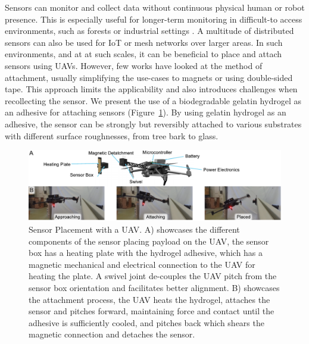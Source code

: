 Sensors can monitor and collect data without continuous physical human or robot presence. This is especially useful for longer-term monitoring in difficult-to access environments, such as forests or industrial settings \cite{Geckeler2022a, Hamaza, Jarvis2018}. A multitude of distributed sensors can also be used for IoT or mesh networks over larger areas. In such environments, and at at such scales, it can be beneficial to place and attach sensors using UAVs. 
However, few works have looked at the method of attachment, usually simplifying the use-cases to magnets or using double-sided tape. This approach limits the applicability and also introduces challenges when recollecting the sensor. We present the use of a biodegradable gelatin hydrogel as an adhesive for attaching sensors (Figure~\ref{fig:fig4-placeholder}). By using gelatin hydrogel as an adhesive, the sensor can be strongly but reversibly attached to various substrates with different surface roughnesses, from tree bark to glass.

\begin{figure}
  \includegraphics[width=\linewidth]{chapters/papers/SB/figures/fig-4-sensor-placement-placeholder/fig-4-sensor-placement-placeholder.pdf}
  \caption{Sensor Placement with a UAV. A) showcases the different components of the sensor placing payload on the UAV, the sensor box has a heating plate with the hydrogel adhesive, which has a magnetic mechanical and electrical connection to the UAV for heating the plate. A swivel joint de-couples the UAV pitch from the sensor box orientation and facilitates better alignment. B) showcases the attachment process, the UAV heats the hydrogel, attaches the sensor and pitches forward, maintaining force and contact until the adhesive is sufficiently cooled, and pitches back which shears the magnetic connection and detaches the sensor.}
  \label{fig:fig4-placeholder}
\end{figure}

